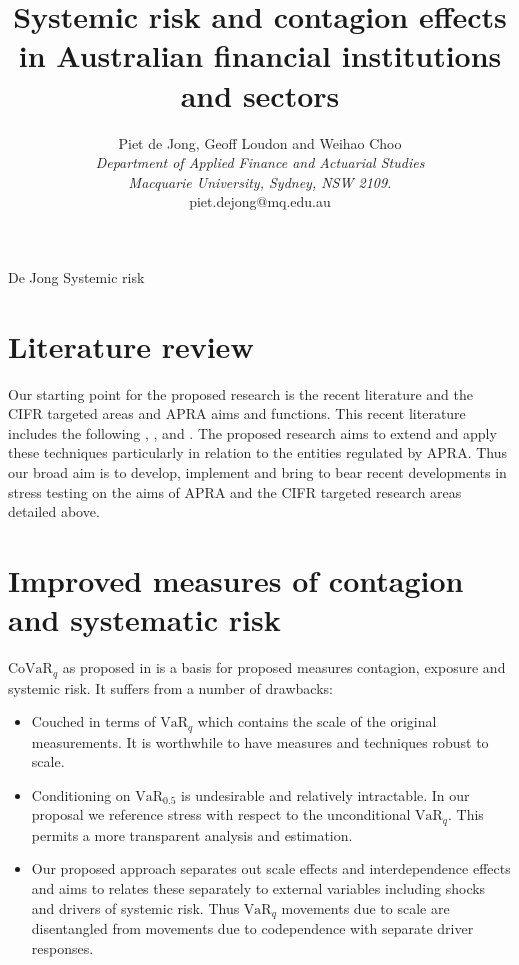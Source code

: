 \documentclass[authoryear]{elsarticle}
\newcommand{\bi}{\begin{itemize}}
\newcommand{\ei}{\end{itemize}}
\renewcommand{\i}{\item}
\newcommand{\var}{\ensuremath{\mathrm{VaR}}}
\newcommand{\covar}{\ensuremath{\mathrm{CoVaR}}}
\renewcommand{\v}{\ensuremath{\mathrm{v}_q}}
\begin{document}
\title{Systemic risk and contagion effects in Australian financial institutions and sectors}
\author{Piet de Jong,  Geoff Loudon and Weihao Choo \\[4pt]
\textit{Department of Applied Finance and Actuarial Studies\\ Macquarie University, Sydney, NSW 2109.}
\\[2pt]
{piet.dejong@mq.edu.au}}

\markboth%
{De Jong}
{Systemic risk}

\maketitle

\section{Literature review}

Our starting point for the proposed research is the recent literature and the CIFR targeted areas and APRA aims and functions.
This recent literature includes the following
\cite{adrian2011covar},
\cite{acharya2012capital},
\cite{acharya2012measuring}
and \cite{brownlees2010volatility}.   The proposed research aims to extend and apply these techniques particularly in relation to the entities regulated by APRA.   Thus our  broad aim is to develop, implement and bring to bear recent developments in stress testing  on the aims of APRA and the CIFR targeted research areas detailed above.   

\section{Improved  measures of contagion and systematic risk}
\renewcommand{\c}{\ensuremath{\mathrm{CoVaR_q}}}
\renewcommand{\v}{\ensuremath{\mathrm{VaR}_q}}

$\covar_q$ as proposed in \cite{adrian2011covar} is a basis for proposed measures contagion, exposure and systemic risk.   It  suffers from a number of drawbacks:
\bi
\i Couched in terms of $\var_q$ which contains the scale of the original measurements.   It is worthwhile to have measures and techniques robust to scale.
\i  Conditioning  on $\var_{0.5}$ is undesirable and relatively intractable.  In our proposal we reference stress with respect  to the unconditional $\var_q$.   This permits a more transparent analysis and estimation. 
\i  Our proposed approach  separates out scale effects and interdependence effects and aims to  relates these separately to external variables including shocks and drivers of systemic risk.   Thus $\var_q$ movements due to scale are disentangled from movements due to codependence with separate driver responses.
\ei
\end{document}
